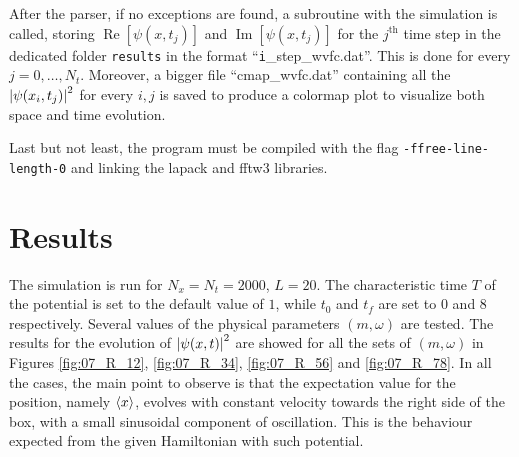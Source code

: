 \documentclass[pra, onecolumn, notitlepage, floats, 11pt]{revtex4-1}
\newcommand{\code}[2][black]{\color{#1}\texttt{#2}}
\begin{document}
After the parser, if no exceptions are found, a subroutine with the simulation is called, storing \( \operatorname{Re}[\psi(x,t_{j})] \) and \( \operatorname{Im}[\psi(x,t_{j})] \) for the \( j^{\text{th}} \) time step in the dedicated folder \code{results} in the format ``\code{i}\_step\_wvfc.dat''. This is done for every \( j = 0, \dots, N_{t} \).
Moreover, a bigger file ``cmap\_wvfc.dat'' containing all the \( \abs{\psi (x_{i},t_{j})}^{2} \) for every \( i,j \) is saved to produce a colormap plot to visualize both space and time evolution.

Last but not least, the program must be compiled with the flag \code{-ffree-line-length-0} and linking the lapack and fftw3 libraries.





\section{Results}
The simulation is run for \( N_{x} = N_{t} = 2000 \), \( L = 20 \). The characteristic time \( T \) of the potential is set to the default value of \( 1 \), while \( t_{0} \) and \( t_{f} \) are set to \( 0 \) and \( 8 \) respectively. Several values of the physical parameters \( (m, \omega) \) are tested.
The results for the evolution of \( \abs{\psi(x,t)}^{2} \) are showed for all the sets of \( (m, \omega) \) in Figures \ref{fig:07_R_12}, \ref{fig:07_R_34}, \ref{fig:07_R_56} and \ref{fig:07_R_78}. In all the cases, the main point to observe is that the expectation value for the position, namely \( \expval{x} \), evolves with constant velocity towards the right side of the box, with a small sinusoidal component of oscillation. This is the behaviour expected from the given Hamiltonian with such potential.
\end{document}

